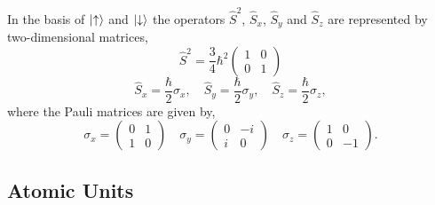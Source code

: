     In the basis of $\ket{\uparrow}$ and $\ket{\downarrow}$ the operators $\hat{S}^2$, 
    $\hat{S}_x$, $\hat{S}_y$ and $\hat{S}_z$ are represented by two-dimensional matrices,
    \begin{equation}
        \hat{S}^2 = \frac{3}{4}\hbar^2\begin{pmatrix}
            1 & 0 \\ 0 & 1 
        \end{pmatrix}
    \end{equation}
    \begin{equation}
        \hat{S}_x = \frac{\hbar}{2}\sigma_x, \quad 
        \hat{S}_y = \frac{\hbar}{2}\sigma_y, \quad 
        \hat{S}_z = \frac{\hbar}{2}\sigma_z,
    \end{equation}
    where the Pauli matrices are given by, 
    \begin{equation}
        \sigma_x = \begin{pmatrix} 0 &  1 \\ 1 & 0 \end{pmatrix} \quad 
        \sigma_y = \begin{pmatrix} 0 & -i \\ i & 0 \end{pmatrix} \quad 
        \sigma_z = \begin{pmatrix} 1 &  0 \\ 0 & -1 \end{pmatrix}.
    \end{equation}

    \subsection{Atomic Units}
    \label{sec:atomic_units}

